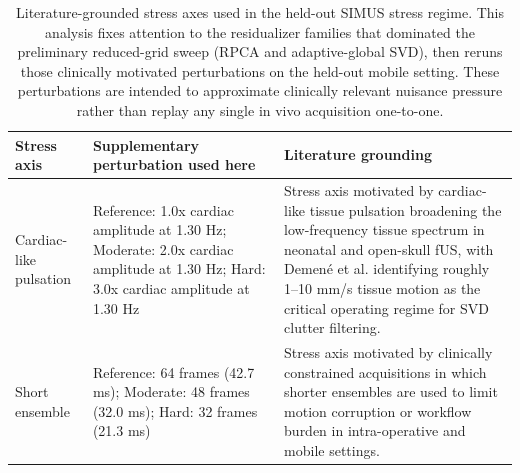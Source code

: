\begin{table}[t]
\centering
\scriptsize
\setlength{\tabcolsep}{3pt}
\begin{tabular}{@{}P{2.8cm} P{4.8cm} P{5.0cm}@{}}
\hline
Stress axis & Supplementary perturbation used here & Literature grounding \\
\hline
Cardiac-like pulsation & Reference: 1.0x cardiac amplitude at 1.30 Hz; Moderate: 2.0x cardiac amplitude at 1.30 Hz; Hard: 3.0x cardiac amplitude at 1.30 Hz & Stress axis motivated by cardiac-like tissue pulsation broadening the low-frequency tissue spectrum in neonatal and open-skull fUS, with Demen\'e et al. identifying roughly 1--10 mm/s tissue motion as the critical operating regime for SVD clutter filtering. \\
Short ensemble & Reference: 64 frames (42.7 ms); Moderate: 48 frames (32.0 ms); Hard: 32 frames (21.3 ms) & Stress axis motivated by clinically constrained acquisitions in which shorter ensembles are used to limit motion corruption or workflow burden in intra-operative and mobile settings. \\
\hline
\end{tabular}
\caption{Literature-grounded stress axes used in the held-out SIMUS stress regime. This analysis fixes attention to the residualizer families that dominated the preliminary reduced-grid sweep (RPCA and adaptive-global SVD), then reruns those clinically motivated perturbations on the held-out mobile setting. These perturbations are intended to approximate clinically relevant nuisance pressure rather than replay any single in vivo acquisition one-to-one.}
\label{tab:simus_clinical_stress_frontier_provenance}
\end{table}
